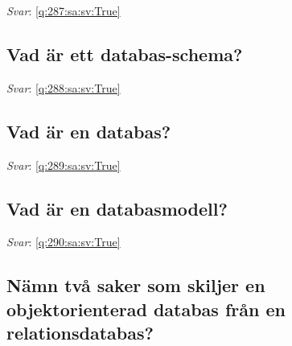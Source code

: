\documentclass[a4paper,11pt,oneside]{article}
\begin{document}
\begin{sloppypar}
\label{q:287:sa:sv:False}

\vspace{2cm}

\noindent\makebox[\textwidth]{\hrulefill}

\vspace{1cm}

\textit{Svar}: \autoref{q:287:sa:sv:True}



\subsection{Vad \"ar ett databas-schema?}

\label{q:288:sa:sv:False}

\vspace{2cm}

\noindent\makebox[\textwidth]{\hrulefill}

\vspace{1cm}

\textit{Svar}: \autoref{q:288:sa:sv:True}



\subsection{Vad \"ar en databas?}

\label{q:289:sa:sv:False}

\vspace{2cm}

\noindent\makebox[\textwidth]{\hrulefill}

\vspace{1cm}

\textit{Svar}: \autoref{q:289:sa:sv:True}



\subsection{Vad \"ar en databasmodell?}

\label{q:290:sa:sv:False}

\vspace{2cm}

\noindent\makebox[\textwidth]{\hrulefill}

\vspace{1cm}

\textit{Svar}: \autoref{q:290:sa:sv:True}



\subsection{N\"amn tv\r{a} saker som skiljer en objektorienterad databas fr\r{a}n en relationsdatabas?}


\end{sloppypar}
\end{document}

